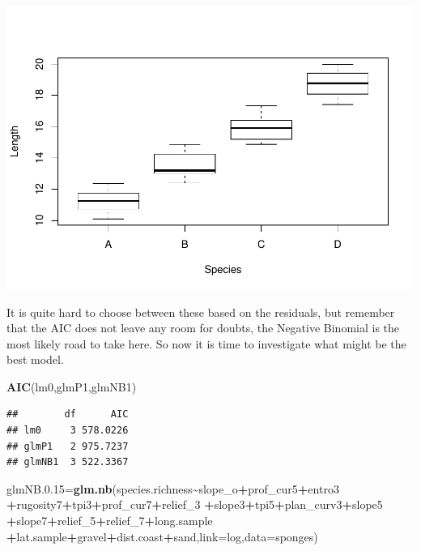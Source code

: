 \documentclass[
]{book}
\newenvironment{Shaded}{\begin{snugshade}}{\end{snugshade}}
\newcommand{\AttributeTok}[1]{\textcolor[rgb]{0.13,0.29,0.53}{#1}}
\newcommand{\FloatTok}[1]{\textcolor[rgb]{0.00,0.00,0.81}{#1}}
\newcommand{\FunctionTok}[1]{\textcolor[rgb]{0.13,0.29,0.53}{\textbf{#1}}}
\newcommand{\NormalTok}[1]{#1}
\newcommand{\OtherTok}[1]{\textcolor[rgb]{0.56,0.35,0.01}{#1}}
\newcommand{\SpecialCharTok}[1]{\textcolor[rgb]{0.81,0.36,0.00}{\textbf{#1}}}
\begin{document}
\includegraphics{ECOMODbook_files/figure-latex/unnamed-chunk-101-1.pdf}

It is quite hard to choose between these based on the residuals, but remember that the AIC does not leave any room for doubts, the Negative Binomial is the most likely road to take here. So now it is time to investigate what might be the best model.

\begin{Shaded}
\begin{Highlighting}[]
\FunctionTok{AIC}\NormalTok{(lm0,glmP1,glmNB1)}
\end{Highlighting}
\end{Shaded}

\begin{verbatim}
##        df      AIC
## lm0     3 578.0226
## glmP1   2 975.7237
## glmNB1  3 522.3367
\end{verbatim}

\begin{Shaded}
\begin{Highlighting}[]
\NormalTok{glmNB.}\FloatTok{0.15}\OtherTok{=}\FunctionTok{glm.nb}\NormalTok{(species.richness}\SpecialCharTok{\textasciitilde{}}\NormalTok{slope\_o}\SpecialCharTok{+}\NormalTok{prof\_cur5}\SpecialCharTok{+}\NormalTok{entro3 }
\SpecialCharTok{+}\NormalTok{rugosity7}\SpecialCharTok{+}\NormalTok{tpi3}\SpecialCharTok{+}\NormalTok{prof\_cur7}\SpecialCharTok{+}\NormalTok{relief\_3 }
\SpecialCharTok{+}\NormalTok{slope3}\SpecialCharTok{+}\NormalTok{tpi5}\SpecialCharTok{+}\NormalTok{plan\_curv3}\SpecialCharTok{+}\NormalTok{slope5 }
\SpecialCharTok{+}\NormalTok{slope7}\SpecialCharTok{+}\NormalTok{relief\_5}\SpecialCharTok{+}\NormalTok{relief\_7}\SpecialCharTok{+}\NormalTok{long.sample }
\SpecialCharTok{+}\NormalTok{lat.sample}\SpecialCharTok{+}\NormalTok{gravel}\SpecialCharTok{+}\NormalTok{dist.coast}\SpecialCharTok{+}\NormalTok{sand,}\AttributeTok{link=}\NormalTok{log,}\AttributeTok{data=}\NormalTok{sponges)}
\end{Highlighting}
\end{Shaded}
\end{document}

